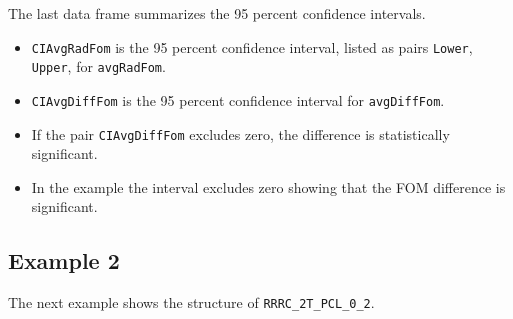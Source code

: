 \documentclass[
]{book}
\newenvironment{Shaded}{\begin{snugshade}}{\end{snugshade}}
\newcommand{\AttributeTok}[1]{\textcolor[rgb]{0.77,0.63,0.00}{#1}}
\newcommand{\DecValTok}[1]{\textcolor[rgb]{0.00,0.00,0.81}{#1}}
\newcommand{\FunctionTok}[1]{\textcolor[rgb]{0.00,0.00,0.00}{#1}}
\newcommand{\NormalTok}[1]{#1}
\newcommand{\OtherTok}[1]{\textcolor[rgb]{0.56,0.35,0.01}{#1}}
\newcommand{\SpecialCharTok}[1]{\textcolor[rgb]{0.00,0.00,0.00}{#1}}
\newcommand{\StringTok}[1]{\textcolor[rgb]{0.31,0.60,0.02}{#1}}
\providecommand{\tightlist}{%
  \setlength{\itemsep}{0pt}\setlength{\parskip}{0pt}}
\begin{document}
The last data frame summarizes the 95 percent confidence intervals.

\begin{itemize}
\tightlist
\item
  \texttt{CIAvgRadFom} is the 95 percent confidence interval, listed as pairs \texttt{Lower}, \texttt{Upper}, for \texttt{avgRadFom}.
\item
  \texttt{CIAvgDiffFom} is the 95 percent confidence interval for \texttt{avgDiffFom}.
\item
  If the pair \texttt{CIAvgDiffFom} excludes zero, the difference is statistically significant.
\item
  In the example the interval excludes zero showing that the FOM difference is significant.
\end{itemize}

\hypertarget{example-2}{%
\subsection{Example 2}\label{example-2}}

The next example shows the structure of \texttt{RRRC\_2T\_PCL\_0\_2}.

\begin{Shaded}
\end{Shaded}
\end{document}
